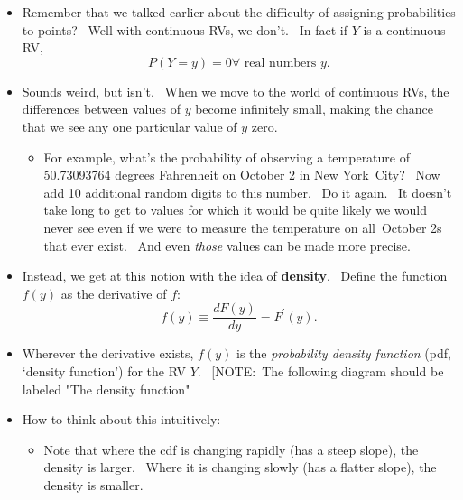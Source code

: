 \documentclass[11pt]{article}
\begin{document}
\begin{itemize}
\item Remember that we talked earlier about the difficulty of assigning
probabilities to points? \ Well with continuous RVs, we don't. \ In fact if $%
Y$ is a continuous RV,%
\begin{equation*}
P(Y=y)=0\forall \text{ real numbers }y\text{.}
\end{equation*}

\item Sounds weird, but isn't. \ When we move to the world of continuous
RVs, the differences between values of $y$ become infinitely small, making
the chance that we see any one particular value of $y$ zero.

\begin{itemize}
\item For example, what's the probability of observing a temperature of
50.73093764 degrees Fahrenheit on October 2 in New York\ City? \ Now add 10
additional random digits to this number. \ Do it again. \ It doesn't take
long to get to values for which it would be quite likely we would never see
even if we were to measure the temperature on all\ October 2s that ever
exist. \ And even \textit{those} values can be made more precise.
\end{itemize}

\item Instead, we get at this notion with the idea of \textbf{density}. \
Define the function $f(y)$ as the derivative of $f$:%
\begin{equation*}
f(y)\equiv \frac{dF(y)}{dy}=F^{\prime }(y).
\end{equation*}

\item Wherever the derivative exists, $f(y)$ is the \textit{probability
density function} (pdf, `density function') for the RV $Y$. \ [NOTE:\ The
following diagram should be labeled "The density function"


\item How to think about this intuitively:

\begin{itemize}
\item Note that where the cdf is changing rapidly (has a steep slope), the
density is larger. \ Where it is changing slowly (has a flatter slope), the
density is smaller.
\end{itemize}


\end{itemize}
\end{document}
